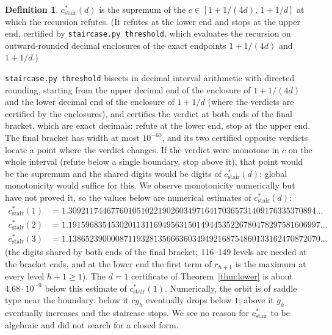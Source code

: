 \documentclass[11pt]{article}
\theoremstyle{definition}
\newtheorem{definition}[theorem]{Definition}
\newcommand{\cstair}{c^{*}_{\mathrm{stair}}}
\begin{document}
\begin{definition}
$\cstair(d)$ is the supremum of the $c\in[1+1/(4d),\,1+1/d]$ at which the recursion refutes. (It refutes at the lower end and stops at the upper end, certified by \texttt{staircase.py threshold}, which evaluates the recursion on outward-rounded decimal enclosures of the exact endpoints $1+1/(4d)$ and $1+1/d$.)
\end{definition}
\texttt{staircase.py threshold} bisects in decimal interval arithmetic with directed rounding, starting from the upper decimal end of the enclosure of $1+1/(4d)$ and the lower decimal end of the enclosure of $1+1/d$ (where the verdicts are certified by the enclosures), and certifies the verdict at both ends of the final bracket, which are exact decimals: refute at the lower end, stop at the upper end. The final bracket has width at most $10^{-60}$, and its two certified opposite verdicts locate a point where the verdict changes. If the verdict were monotone in $c$ on the whole interval (refute below a single boundary, stop above it), that point would be the supremum and the shared digits would be digits of $\cstair(d)$; global monotonicity would suffice for this. We observe monotonicity numerically but have not proved it, so the values below are numerical estimates of $\cstair(d)$:
\begin{align*}
\cstair(1)&=1.3092117446776010510221902603497164170365731409176335370894\ldots\\
\cstair(2)&=1.19159683545302011311694956315014944535226780478297581606997\ldots\\
\cstair(3)&=1.13865239000087119328135666360349492168754860133162470872070\ldots
\end{align*}
(the digits shared by both ends of the final bracket; 116--149 levels are needed at the bracket ends, and at the lower end the first term of $r_{h+1}$ is the maximum at every level $h+1\ge1$). The $d=1$ certificate of Theorem~\ref{thm:lower} is about $4.68\cdot10^{-9}$ below this estimate of $\cstair(1)$. Numerically, the orbit is of saddle type near the boundary: below it $cg_h$ eventually drops below $1$; above it $g_h$ eventually increases and the staircase stops. We see no reason for $\cstair$ to be algebraic and did not search for a closed form.
\end{document}
